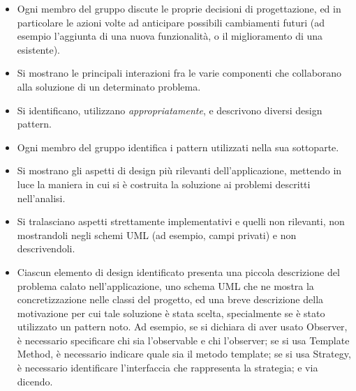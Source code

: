 \documentclass[a4paper,12pt]{report}
\begin{document}
\begin{itemize}
	\item Ogni membro del gruppo discute le proprie decisioni di progettazione, ed in particolare le azioni volte ad anticipare possibili cambiamenti futuri (ad esempio l'aggiunta di una nuova funzionalità, o il miglioramento di una esistente).
	\item Si mostrano le principali interazioni fra le varie componenti che collaborano alla soluzione di un determinato problema.
	\item Si identificano, utilizzano \textit{appropriatamente}, e descrivono diversi design pattern.
	\item Ogni membro del gruppo identifica i pattern utilizzati nella sua sottoparte.
	\item Si mostrano gli aspetti di design più rilevanti dell'applicazione, mettendo in luce la maniera in cui si è costruita la soluzione ai problemi descritti nell'analisi.
	\item Si tralasciano aspetti strettamente implementativi e quelli non rilevanti, non mostrandoli negli schemi UML (ad esempio, campi privati) e non descrivendoli.
	\item Ciascun elemento di design identificato presenta una piccola descrizione del problema calato
nell'applicazione, uno schema UML che ne mostra la concretizzazione nelle classi del progetto, ed
una breve descrizione della motivazione per cui tale soluzione è stata scelta, specialmente se è stato utilizzato un pattern noto. Ad esempio, se si
dichiara di aver usato Observer, è necessario specificare chi sia l'observable e chi l'observer; se
si usa Template Method, è necessario indicare quale sia il metodo template; se si usa Strategy, è
necessario identificare l'interfaccia che rappresenta la strategia; e via dicendo.
\end{itemize}
\end{document}
